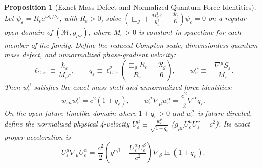 \documentclass[11pt, a4paper]{article}
\newtheorem{proposition}[theorem]{Proposition}
\theoremstyle{definition}
\begin{document}
\begin{proposition}[Exact Mass-Defect and Normalized Quantum-Force Identities]
\label{prop:quantum_force_identity}
Let $\psi_\varepsilon = R_\varepsilon e^{iS_\varepsilon/\hbar_\varepsilon}$, with $R_\varepsilon > 0$, solve $\left(\Box_g + \frac{M_\varepsilon^2 c^2}{\hbar_\varepsilon^2} - \frac{\mathcal{R}_g}{6}\right)\psi_\varepsilon = 0$ on a regular open domain of $(\mathcal{M}, g_{\mu\nu})$, where $M_\varepsilon > 0$ is constant in spacetime for each member of the family. Define the reduced Compton scale, dimensionless quantum mass defect, and unnormalized phase-gradient velocity:
\begin{equation}
\label{eq:q_defect_definition}
\ell_{C,\varepsilon} \equiv \frac{\hbar_\varepsilon}{M_\varepsilon c}, \qquad q_\varepsilon \equiv \ell_{C,\varepsilon}^2 \left( \frac{\Box_g R_\varepsilon}{R_\varepsilon} - \frac{\mathcal{R}_g}{6} \right), \qquad w_\varepsilon^\mu \equiv -\frac{\nabla^\mu S_\varepsilon}{M_\varepsilon}.
\end{equation}
Then $w_\varepsilon^\mu$ satisfies the exact mass-shell and unnormalized force identities:
\begin{equation}
\label{eq:unnormalized_quantum_force}
w_{\varepsilon\mu} w_\varepsilon^\mu = c^2(1 + q_\varepsilon), \qquad w_\varepsilon^\mu \nabla_\mu w_\varepsilon^\alpha = \frac{c^2}{2}\nabla^\alpha q_\varepsilon.
\end{equation}
On the open future-timelike domain where $1 + q_\varepsilon > 0$ and $w_\varepsilon^\mu$ is future-directed, define the normalized physical 4-velocity $U_\varepsilon^\mu \equiv \frac{w_\varepsilon^\mu}{\sqrt{1 + q_\varepsilon}}$ ($g_{\mu\nu}U_\varepsilon^\mu U_\varepsilon^\nu = c^2$). Its exact proper acceleration is
\begin{equation}
\label{eq:normalized_quantum_force}
U_\varepsilon^\mu \nabla_\mu U_\varepsilon^\alpha = \frac{c^2}{2}\left( g^{\alpha\beta} - \frac{U_\varepsilon^\alpha U_\varepsilon^\beta}{c^2} \right) \nabla_\beta \ln(1 + q_\varepsilon).
\end{equation}
\end{proposition}
\end{document}
